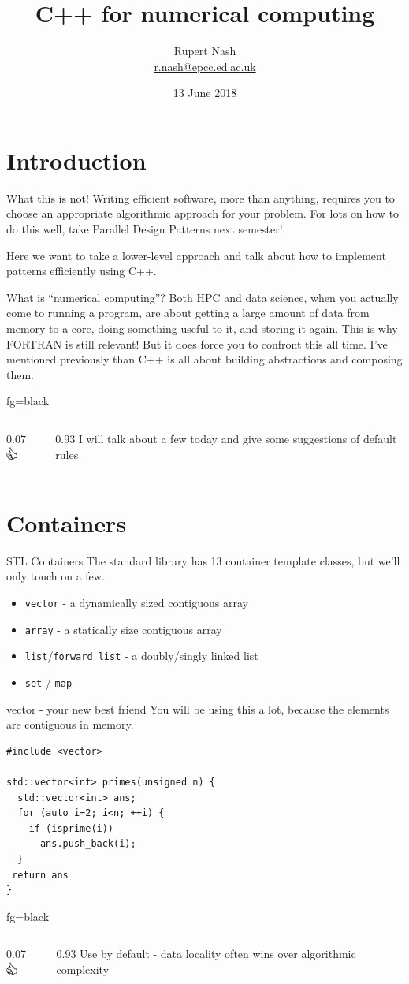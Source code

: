 \documentclass[presentation,t]{beamer}
\author{Rupert Nash\\ \url{r.nash@epcc.ed.ac.uk}}
\date{13 June 2018}
\title{C++ for numerical computing}
\newcommand{\code}[1]{\lstinline!#1!}
\newcommand{\thumb}[1]{
  \vfill{}
  \begin{beamercolorbox}{fg=black}
    \begin{columns}[c,onlytextwidth]
      \begin{column}{0.07\textwidth}
        \includegraphics[width=1em]{thumbs_up}
      \end{column}
      \begin{column}{0.93\textwidth}
        #1
      \end{column}
    \end{columns}
  \end{beamercolorbox}
}
\begin{document}
\frame{\titlepage}
\section{Introduction}
\begin{frame}{What this is not!}
  Writing efficient software, more than anything, requires you to
  choose an appropriate algorithmic approach for your problem. For
  lots on how to do this well, take Parallel Design Patterns next
  semester!

  Here we want to take a lower-level approach and talk about how to
  implement patterns efficiently using C++.
\end{frame}

\begin{frame}{What is ``numerical computing''?}
  Both HPC and data science, when you actually come to running a
  program, are about getting a large amount of data from memory to a
  core, doing something useful to it, and storing it again.
  \vfill
  This is why FORTRAN is still relevant! But it does force you to
  confront this all time.
  \vfill
  I've mentioned previously than C++ is all about building
  abstractions and composing them.

  \thumb{I will talk about a few today and give some suggestions
  of default rules}
\end{frame}

\section{Containers}
\begin{frame}{STL Containers}
  The standard library has 13 container template classes, but we'll
  only touch on a few.

  \begin{itemize}
  \item \code{vector} - a dynamically sized contiguous array
  \item \code{array} - a statically size contiguous array
  \item \code{list}/\code{forward_list} - a doubly/singly linked list
  \item \code{set} / \code{map}
    
  \end{itemize}

\end{frame}

\begin{frame}[fragile]{vector - your new best friend}
  You will be using this a lot, because the elements are contiguous in
  memory.
\begin{lstlisting}
#include <vector>

std::vector<int> primes(unsigned n) {
  std::vector<int> ans;
  for (auto i=2; i<n; ++i) {
    if (isprime(i))
      ans.push_back(i);
  }
 return ans
}
\end{lstlisting}
  \thumb{Use by default - data locality often wins over algorithmic complexity}
\end{frame}
\end{document}
